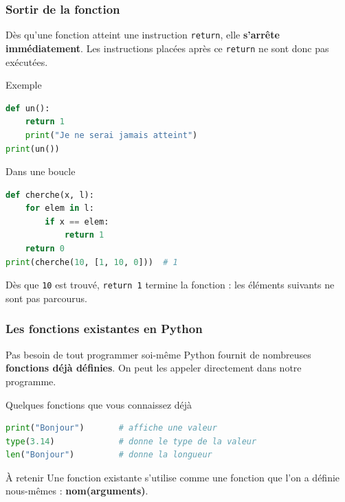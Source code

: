 \documentclass[10pt]{beamer}
\begin{document}
\begin{frame}[containsverbatim]
	\frametitle{Sortir de la fonction}

		\small Dès qu'une fonction atteint une instruction \texttt{return},
		elle \textbf{s'arrête immédiatement}. Les instructions placées après ce \texttt{return}
		ne sont donc pas exécutées.

	

	
	\begin{exampleblock}{Exemple}
\begin{lstlisting}[language=Python]
def un():
	return 1
	print("Je ne serai jamais atteint")
print(un())
\end{lstlisting}
	\end{exampleblock}
	


	
	\begin{alertblock}{Dans une boucle}
		\begin{lstlisting}[language=Python]
def cherche(x, l):
	for elem in l:
		if x == elem:
			return 1
	return 0
print(cherche(10, [1, 10, 0]))  # 1
		\end{lstlisting}
		
		
		\small Dès que \texttt{10} est trouvé, \texttt{return 1} termine
		la fonction : les éléments suivants ne sont pas parcourus.
	\end{alertblock}
	
	
\end{frame}
\begin{frame}[containsverbatim]
	\frametitle{Les fonctions existantes en Python}
	

	\begin{block}{Pas besoin de tout programmer soi-même}
		Python fournit de nombreuses \textbf{fonctions déjà définies}.
		On peut les appeler directement dans notre programme.
	\end{block}
	
	\vspace{0.15cm}
	
	\begin{exampleblock}{Quelques fonctions que vous connaissez déjà}
\begin{lstlisting}[language=Python]
print("Bonjour")       # affiche une valeur
type(3.14)             # donne le type de la valeur
len("Bonjour")         # donne la longueur
\end{lstlisting}
	\end{exampleblock}
	

	\vspace{0.1cm}
	
	\begin{alertblock}{À retenir}
		Une fonction existante s'utilise comme une fonction que
		l'on a définie nous-mêmes : \textbf{nom(arguments)}.
	\end{alertblock}
	
	
\end{frame}
\end{document}
